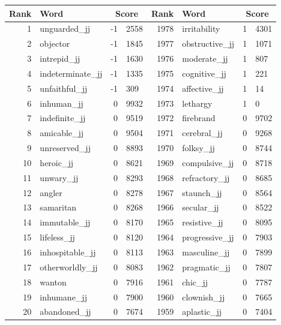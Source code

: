 \begin{table}[tbp]
    \begin{tabular}{| rlr@{.}l | rlr@{.}l |}
    \hline
    \textbf{Rank} & \textbf{Word} & \multicolumn{2}{c|}{\textbf{Score}} & \textbf{Rank} & \textbf{Word} & \multicolumn{2}{c|}{\textbf{Score}} \\
    \hline
    1 & unguarded\_jj & -1 & 2558    &    1978 & irritability & 1 & 4301 \\
    2 & objector & -1 & 1845    &    1977 & obstructive\_jj & 1 & 1071 \\
    3 & intrepid\_jj & -1 & 1630    &    1976 & moderate\_jj & 1 & 807 \\
    4 & indeterminate\_jj & -1 & 1335    &    1975 & cognitive\_jj & 1 & 221 \\
    5 & unfaithful\_jj & -1 & 309    &    1974 & affective\_jj & 1 & 14 \\
    6 & inhuman\_jj & 0 & 9932    &    1973 & lethargy & 1 & 0 \\
    7 & indefinite\_jj & 0 & 9519    &    1972 & firebrand & 0 & 9702 \\
    8 & amicable\_jj & 0 & 9504    &    1971 & cerebral\_jj & 0 & 9268 \\
    9 & unreserved\_jj & 0 & 8893    &    1970 & folksy\_jj & 0 & 8744 \\
    10 & heroic\_jj & 0 & 8621    &    1969 & compulsive\_jj & 0 & 8718 \\
    11 & unwary\_jj & 0 & 8293    &    1968 & refractory\_jj & 0 & 8685 \\
    12 & angler & 0 & 8278    &    1967 & staunch\_jj & 0 & 8564 \\
    13 & samaritan & 0 & 8268    &    1966 & secular\_jj & 0 & 8522 \\
    14 & immutable\_jj & 0 & 8170    &    1965 & resistive\_jj & 0 & 8095 \\
    15 & lifeless\_jj & 0 & 8120    &    1964 & progressive\_jj & 0 & 7903 \\
    16 & inhospitable\_jj & 0 & 8113    &    1963 & masculine\_jj & 0 & 7899 \\
    17 & otherworldly\_jj & 0 & 8083    &    1962 & pragmatic\_jj & 0 & 7807 \\
    18 & wanton & 0 & 7916    &    1961 & chic\_jj & 0 & 7787 \\
    19 & inhumane\_jj & 0 & 7900    &    1960 & clownish\_jj & 0 & 7665 \\
    20 & abandoned\_jj & 0 & 7674    &    1959 & aplastic\_jj & 0 & 7404 \\

\end{tabular}
\end{table}
